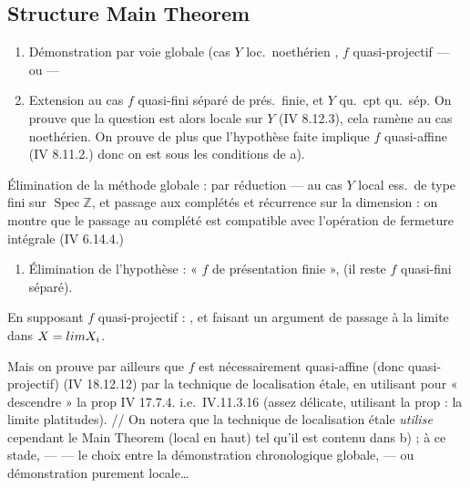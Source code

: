 \documentclass[11pt,a4paper]{article}
\begin{document}
\subsection{Structure Main Theorem}

\begin{enumerate}
  \item[a)] Démonstration par voie globale (cas $Y$ loc.\ noethérien
    , $f$ quasi-projectif — ou  —
  \item[b)] Extension au cas $f$ quasi-fini séparé de prés.\ finie, et $Y$ qu.\
    cpt qu.\ sép. On prouve que la question est alors locale sur $Y$
    (IV 8.12.3), cela ramène au cas noethérien. On prouve de plus que
    l'hypothèse faite implique $f$ quasi-affine (IV 8.11.2.) donc on est sous
    les conditions de a).
\end{enumerate}

Élimination de la méthode globale : par réduction — au cas $Y$ local ess.\ de
type fini sur $\operatorname{Spec} \mathbb{Z}$, et passage aux complétés et
récurrence sur la dimension : on montre que le passage au complété est
compatible avec l'opération de fermeture intégrale (IV 6.14.4.)

\begin{enumerate}
  \item[c)] Élimination de l'hypothèse : 
    « $f$ de présentation finie », \struck{\ill{}} (il reste $f$ quasi-fini
    séparé).
\end{enumerate}

 En supposant $f$ quasi-projectif : , et
faisant un argument de passage à la limite dans $X = \varprojlim X_i$.

 Mais on prouve par ailleurs que $f$ est
nécessairement quasi-affine (donc quasi-projectif) (IV 18.12.12) par la
technique de localisation étale, en utilisant pour « descendre » la prop
IV 17.7.4. i.e.\ IV.11.3.16 (assez délicate, \struck{\ill{}} utilisant la
prop : la limite \uncertain{des} platitudes). // On notera que la technique
de localisation étale \emph{utilise} cependant le Main Theorem (local en
haut) tel qu'il est contenu dans b) ; à ce stade, — — le choix entre la
démonstration chronologique globale, — ou démonstration purement locale…
\end{document}
